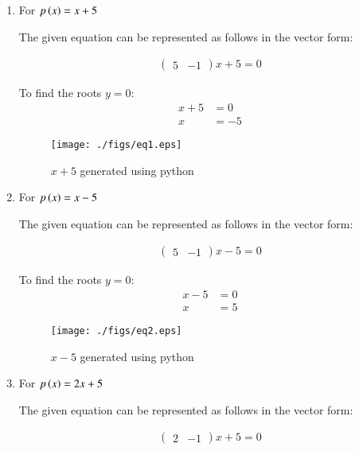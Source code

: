 \renewcommand{\theequation}{\theenumi}
\begin{enumerate}[label=\thesection.\arabic*.,ref=\thesection.\theenumi]

\item \solution For $p\left(x\right) = x + 5$ 
\begin{flushleft}
The given equation can be represented as follows in the vector form:
\end{flushleft}
\begin{align}
\begin{pmatrix}
5 & -1 
\end{pmatrix}
x + 5 = 0
\end{align}

To find the roots $y=0$:
\begin{align}
x + 5 &= 0 \\
x &= -5
\end{align}
\begin{figure}[!ht]
\centering
\texttt{[image: ./figs/eq1.eps]}
\caption{$x + 5$ generated using python}
\label{fig:eq1}
\end{figure} 
\item \solution For $p\left(x\right) = x - 5$
\begin{flushleft}
The given equation can be represented as follows in the vector form:
\end{flushleft}
\begin{align}
\begin{pmatrix}
5 & -1 
\end{pmatrix}
x - 5 = 0
\end{align}

To find the roots $y=0$:
\begin{align}
x - 5 &= 0 \\
x &= 5
\end{align}
\begin{figure}[!ht]
\centering
\texttt{[image: ./figs/eq2.eps]}
\caption{$x - 5$ generated using python}
\label{fig:eq2}
\end{figure}

\item \solution For $p\left(x\right) = 2x + 5$
\begin{flushleft}
The given equation can be represented as follows in the vector form:
\end{flushleft}
\begin{align}
\begin{pmatrix}
2 & -1 
\end{pmatrix}
x + 5 = 0
\end{align}


\end{enumerate}
